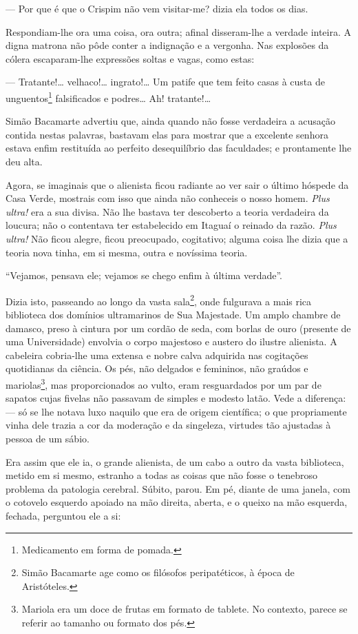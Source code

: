 --- Por que é que o Crispim não vem visitar-me? dizia ela todos os dias.

Respondiam-lhe ora uma coisa, ora outra; afinal disseram-lhe a verdade
inteira. A digna matrona não pôde conter a indignação e a vergonha. Nas
explosões da cólera escaparam-lhe expressões soltas e vagas, como estas:

--- Tratante!\ldots{} velhaco!\ldots{} ingrato!\ldots{} Um patife que tem feito casas à
custa de unguentos\footnote{Medicamento em forma de pomada.}
falsificados e podres\ldots{} Ah! tratante!\ldots{}

Simão Bacamarte advertiu que, ainda quando não fosse verdadeira a
acusação contida nestas palavras, bastavam elas para mostrar que a
excelente senhora estava enfim restituída ao perfeito desequilíbrio das
faculdades; e prontamente lhe deu alta.

Agora, se imaginais que o alienista ficou radiante ao ver sair o último
hóspede da Casa Verde, mostrais com isso que ainda não conheceis o nosso
homem. \emph{Plus ultra!} era a sua divisa. Não lhe bastava ter
descoberto a teoria verdadeira da loucura; não o contentava ter
estabelecido em Itaguaí o reinado da razão. \emph{Plus ultra!} Não ficou
alegre, ficou preocupado, cogitativo; alguma coisa lhe dizia que a
teoria nova tinha, em si mesma, outra e novíssima teoria.

``Vejamos, pensava ele; vejamos se chego enfim à última verdade''.

Dizia isto, passeando ao longo da vasta sala\footnote{Simão Bacamarte
  age como os filósofos peripatéticos, à época de Aristóteles.}, onde
fulgurava a mais rica biblioteca dos domínios ultramarinos de Sua
Majestade. Um amplo chambre de damasco, preso à cintura por um cordão de
seda, com borlas de ouro (presente de uma Universidade) envolvia o corpo
majestoso e austero do ilustre alienista. A cabeleira cobria-lhe uma
extensa e nobre calva adquirida nas cogitações quotidianas da ciência.
Os pés, não delgados e femininos, não graúdos e mariolas\footnote{Mariola
  era um doce de frutas em formato de tablete. No contexto, parece se
  referir ao tamanho ou formato dos pés.}, mas proporcionados ao vulto,
eram resguardados por um par de sapatos cujas fivelas não passavam de
simples e modesto latão. Vede a diferença: --- só se lhe notava luxo
naquilo que era de origem científica; o que propriamente vinha dele
trazia a cor da moderação e da singeleza, virtudes tão ajustadas à
pessoa de um sábio.

Era assim que ele ia, o grande alienista, de um cabo a outro da vasta
biblioteca, metido em si mesmo, estranho a todas as coisas que não fosse
o tenebroso problema da patologia cerebral. Súbito, parou. Em pé, diante
de uma janela, com o cotovelo esquerdo apoiado na mão direita, aberta, e
o queixo na mão esquerda, fechada, perguntou ele a si:

